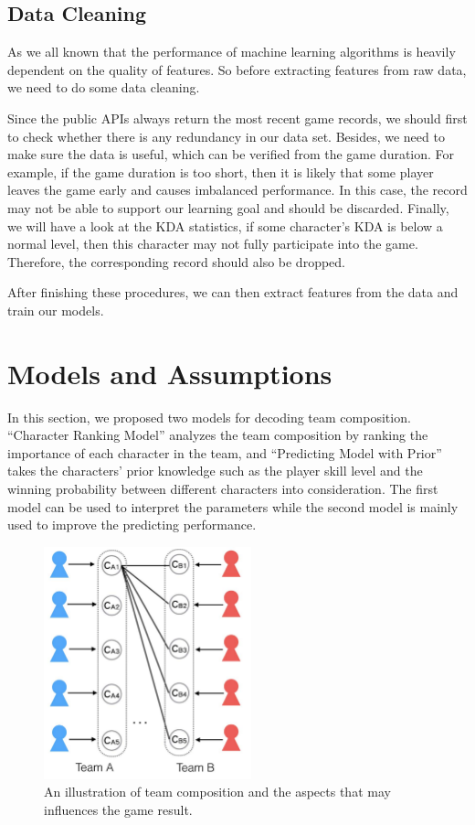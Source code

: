 \documentclass{article} %
\begin{document}
\subsection{Data Cleaning}

As we all known that the performance of machine learning algorithms is heavily dependent on the quality of features. So before extracting features from raw data, we need to do some data cleaning.

Since the public APIs always return the most recent game records, we should first to check whether there is any redundancy in our data set. Besides, we need to make sure the data is useful, which can be verified from the game duration. For example, if the game duration is too short, then it is likely that some player leaves the game early and causes imbalanced performance. In this case, the record may not be able to support our learning goal and should be discarded. Finally, we will have a look at the KDA statistics, if some character's KDA is below a normal level, then this character may not fully participate into the game. Therefore, the corresponding record should also be dropped.

After finishing these procedures, we can then extract features from the data and train our models.


\section{Models and Assumptions}

In this section, we proposed two models for decoding team composition. ``Character Ranking Model'' analyzes the team composition by ranking the importance of each character in the team, and ``Predicting Model with Prior'' takes the characters' prior knowledge such as the player skill level and the winning probability between different characters into consideration. The first model can be used to interpret the parameters while the second model is mainly used to improve the predicting performance.

\begin{figure}[t]
  \centering
    \includegraphics[width=60mm]{team_comp.pdf}
  \caption{An illustration of team composition and the aspects that may influences the game result.}
  \label{fig:team_comp}
\end{figure}
\end{document}
